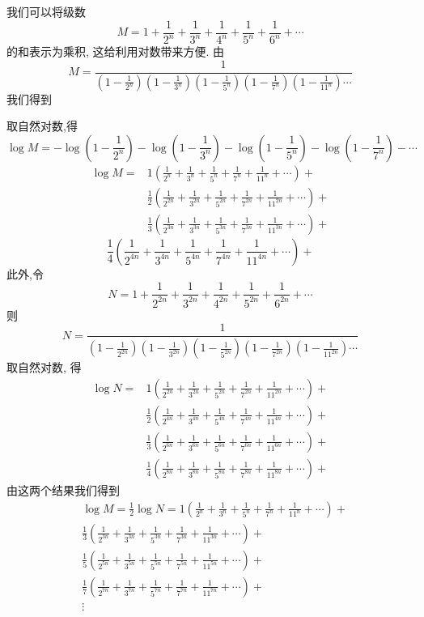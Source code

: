 我们可以将级数
\[
M=1+\frac{1}{2^{n}}+\frac{1}{3^{n}}+\frac{1}{4^{n}}+\frac{1}{5^{n}}+\frac{1}{6^{n}}+\cdots
\]
的和表示为乘积, 这给利用对数带来方便. 由
\[
M=\frac{1}{\left(1-\frac{1}{2^{n}}\right)\left(1-\frac{1}{3^{n}}\right)\left(1-\frac{1}{5^{n}}\right)\left(1-\frac{1}{7^{n}}\right)\left(1-\frac{1}{11^{n}}\right) \cdots}
\]
我们得到

取自然对数,得
\[
\log M=-\log \left(1-\frac{1}{2^{n}}\right)-\log \left(1-\frac{1}{3^{n}}\right)-\log \left(1-\frac{1}{5^{n}}\right)-\log \left(1-\frac{1}{7^{n}}\right)-\cdots
\]
\[
\begin{aligned}
\log M= & 1\left(\frac{1}{2^{n}}+\frac{1}{3^{n}}+\frac{1}{5^{n}}+\frac{1}{7^{n}}+\frac{1}{11^{n}}+\cdots\right)+ \\
& \frac{1}{2}\left(\frac{1}{2^{2 n}}+\frac{1}{3^{2 n}}+\frac{1}{5^{2 n}}+\frac{1}{7^{2 n}}+\frac{1}{11^{2 n}}+\cdots\right)+ \\
& \frac{1}{3}\left(\frac{1}{2^{3 n}}+\frac{1}{3^{3 n}}+\frac{1}{5^{3 n}}+\frac{1}{7^{3 n}}+\frac{1}{11^{3 n}}+\cdots\right)+
\end{aligned}
\]
\[
\frac{1}{4}\left(\frac{1}{2^{4 n}}+\frac{1}{3^{4 n}}+\frac{1}{5^{4 n}}+\frac{1}{7^{4 n}}+\frac{1}{11^{4 n}}+\cdots\right)+
\]
此外,令
\[
N=1+\frac{1}{2^{2 n}}+\frac{1}{3^{2 n}}+\frac{1}{4^{2 n}}+\frac{1}{5^{2 n}}+\frac{1}{6^{2 n}}+\cdots
\]
则
\[
N=\frac{1}{\left(1-\frac{1}{2^{2 n}}\right)\left(1-\frac{1}{3^{2 n}}\right)\left(1-\frac{1}{5^{2 n}}\right)\left(1-\frac{1}{7^{2 n}}\right)\left(1-\frac{1}{11^{2 n}}\right) \cdots}
\]
取自然对数, 得
\[
\begin{aligned}
\log N= & 1\left(\frac{1}{2^{2 n}}+\frac{1}{3^{2 n}}+\frac{1}{5^{2 n}}+\frac{1}{7^{2 n}}+\frac{1}{11^{2 n}}+\cdots\right)+ \\
& \frac{1}{2}\left(\frac{1}{2^{4 n}}+\frac{1}{3^{4 n}}+\frac{1}{5^{4 n}}+\frac{1}{7^{4 n}}+\frac{1}{11^{4 n}}+\cdots\right)+ \\
& \frac{1}{3}\left(\frac{1}{2^{6 n}}+\frac{1}{3^{6 n}}+\frac{1}{5^{6 n}}+\frac{1}{7^{6 n}}+\frac{1}{11^{6 n}}+\cdots\right)+ \\
& \frac{1}{4}\left(\frac{1}{2^{8 n}}+\frac{1}{3^{8 n}}+\frac{1}{5^{8 n}}+\frac{1}{7^{8 n}}+\frac{1}{11^{8 n}}+\cdots\right)+
\end{aligned}
\]
由这两个结果我们得到
\[
\begin{aligned}
& \log M=\frac{1}{2} \log N= 1\left(\frac{1}{2^{n}}+\frac{1}{3^{n}}+\frac{1}{5^{n}}+\frac{1}{7^{n}}+\frac{1}{11^{n}}+\cdots\right)+ \\
& \frac{1}{3}\left(\frac{1}{2^{3 n}}+\frac{1}{3^{3 n}}+\frac{1}{5^{3 n}}+\frac{1}{7^{3 n}}+\frac{1}{11^{3 n}}+\cdots\right)+ \\
& \frac{1}{5}\left(\frac{1}{2^{5 n}}+\frac{1}{3^{5 n}}+\frac{1}{5^{5 n}}+\frac{1}{7^{5 n}}+\frac{1}{11^{5 n}}+\cdots\right)+ \\
& \frac{1}{7}\left(\frac{1}{2^{7 n}}+\frac{1}{3^{7 n}}+\frac{1}{5^{7 n}}+\frac{1}{7^{7 n}}+\frac{1}{11^{7 n}}+\cdots\right)+ \\
& \vdots
\end{aligned}
\]
